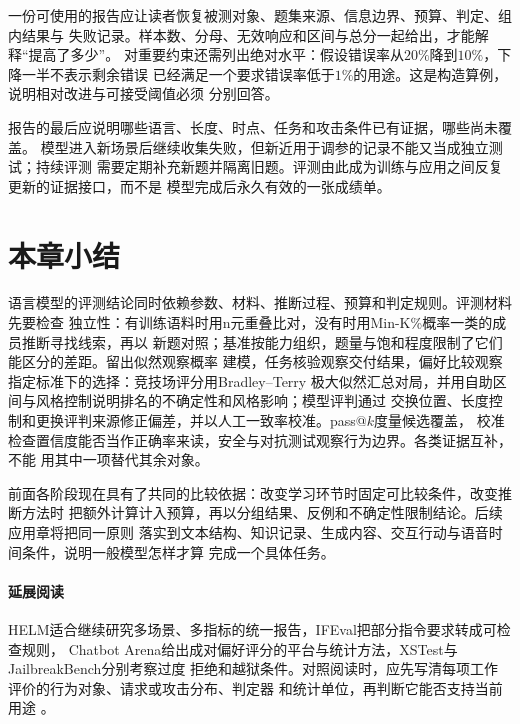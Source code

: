 一份可使用的报告应让读者恢复被测对象、题集来源、信息边界、预算、判定、组内结果与
失败记录。样本数、分母、无效响应和区间与总分一起给出，才能解释“提高了多少”。
对重要约束还需列出绝对水平：假设错误率从$20\%$降到$10\%$，下降一半不表示剩余错误
已经满足一个要求错误率低于$1\%$的用途。这是构造算例，说明相对改进与可接受阈值必须
分别回答。

报告的最后应说明哪些语言、长度、时点、任务和攻击条件已有证据，哪些尚未覆盖。
模型进入新场景后继续收集失败，但新近用于调参的记录不能又当成独立测试；持续评测
需要定期补充新题并隔离旧题。评测由此成为训练与应用之间反复更新的证据接口，而不是
模型完成后永久有效的一张成绩单。

\section{本章小结}
\label{sec:nlp-eval-summary}

语言模型的评测结论同时依赖参数、材料、推断过程、预算和判定规则。评测材料先要检查
独立性：有训练语料时用n元重叠比对，没有时用Min-K\%概率一类的成员推断寻找线索，再以
新题对照；基准按能力组织，题量与饱和程度限制了它们能区分的差距。留出似然观察概率
建模，任务核验观察交付结果，偏好比较观察指定标准下的选择：竞技场评分用Bradley--Terry
极大似然汇总对局，并用自助区间与风格控制说明排名的不确定性和风格影响；模型评判通过
交换位置、长度控制和更换评判来源修正偏差，并以人工一致率校准。pass@$k$度量候选覆盖，
校准检查置信度能否当作正确率来读，安全与对抗测试观察行为边界。各类证据互补，不能
用其中一项替代其余对象。

前面各阶段现在具有了共同的比较依据：改变学习环节时固定可比较条件，改变推断方法时
把额外计算计入预算，再以分组结果、反例和不确定性限制结论。后续应用章将把同一原则
落实到文本结构、知识记录、生成内容、交互行动与语音时间条件，说明一般模型怎样才算
完成一个具体任务。

\paragraph{延展阅读}
HELM适合继续研究多场景、多指标的统一报告，IFEval把部分指令要求转成可检查规则，
Chatbot Arena给出成对偏好评分的平台与统计方法，XSTest与JailbreakBench分别考察过度
拒绝和越狱条件。对照阅读时，应先写清每项工作评价的行为对象、请求或攻击分布、判定器
和统计单位，再判断它能否支持当前用途
。
